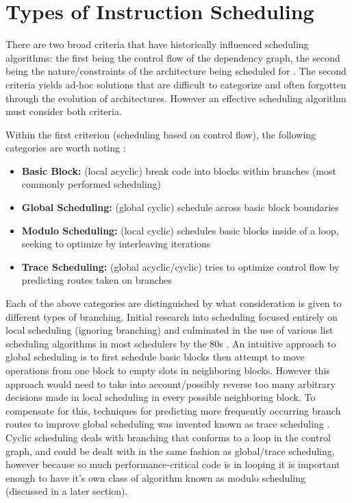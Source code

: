 \documentclass[12pt]{report}
\begin{document}
\section{Types of Instruction Scheduling}
\label{sec:orgacd11a0}
There are two broad criteria that have historically influenced scheduling
algorithms: the first being the control flow of the dependency graph, the
second being the nature/constraints of the architecture being scheduled for
\parencite{rau1993instruction}. The second criteria yields ad-hoc solutions
that are difficult to categorize and often forgotten through the evolution of
architectures. However an effective scheduling algorithm must consider both criteria.

Within the first criterion (scheduling based on control flow), the following
categories are worth noting \parencite{rau1993instruction}:
\begin{itemize}
\item \textbf{Basic Block:} (local acyclic) break code into blocks within branches (most commonly performed scheduling)
\item \textbf{Global Scheduling:} (global cyclic) schedule across basic block boundaries
\item \textbf{Modulo Scheduling:} (local cyclic) schedules basic blocks inside of a loop, seeking to
optimize by interleaving iterations
\item \textbf{Trace Scheduling:} (global acyclic/cyclic) tries to optimize control flow by predicting routes
taken on branches
\end{itemize}
Each of the above categories are distinguished by what consideration is given
to different types of branching. Initial research into scheduling focused
entirely on local scheduling (ignoring branching)
\parencite{rau1993instruction} and culminated in the use of various list
scheduling algorithms in most schedulers by the 80s
\parencite{fisher1983very}. An intuitive approach to global scheduling is to
first schedule basic blocks then attempt to move operations from one block to
empty slots in neighboring blocks. However this approach would need to take
into account/possibly reverse too many arbitrary decisions made in local
scheduling in every possible neighboring block. To compensate for this,
techniques for predicting more frequently occurring branch routes to improve
global scheduling was invented known as trace scheduling
\parencite{fisher1981trace}. Cyclic scheduling deals with branching that
conforms to a loop in the control graph, and could be dealt with in the same
fashion as global/trace scheduling, however because so much
performance-critical code is in looping it is important enough to
have it's own class of algorithm known as modulo scheduling (discussed in a
later section).
\end{document}
